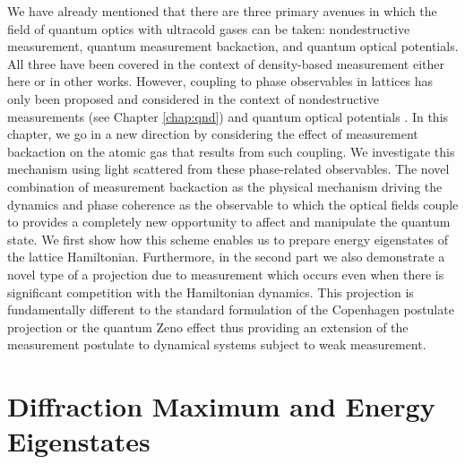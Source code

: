 We have already mentioned that there are three primary avenues in
which the field of quantum optics with ultracold gases can be taken:
nondestructive measurement, quantum measurement backaction, and
quantum optical potentials. All three have been covered in the context
of density-based measurement either here or in other works. However,
coupling to phase observables in lattices has only been proposed and
considered in the context of nondestructive measurements (see Chapter
\ref{chap:qnd}) and quantum optical potentials \cite{caballero2015,
  caballero2015njp, caballero2016, caballero2016a}. In this chapter,
we go in a new direction by considering the effect of measurement
backaction on the atomic gas that results from such coupling.  We
investigate this mechanism using light scattered from these
phase-related observables. The novel combination of measurement
backaction as the physical mechanism driving the dynamics and phase
coherence as the observable to which the optical fields couple to
provides a completely new opportunity to affect and manipulate the
quantum state. We first show how this scheme enables us to prepare
energy eigenstates of the lattice Hamiltonian. Furthermore, in the
second part we also demonstrate a novel type of a projection due to
measurement which occurs even when there is significant competition
with the Hamiltonian dynamics. This projection is fundamentally
different to the standard formulation of the Copenhagen postulate
projection or the quantum Zeno effect \cite{misra1977, facchi2008,
  raimond2010, raimond2012, signoles2014} thus providing an extension
of the measurement postulate to dynamical systems subject to weak
measurement.


\section{Diffraction Maximum and Energy Eigenstates}

